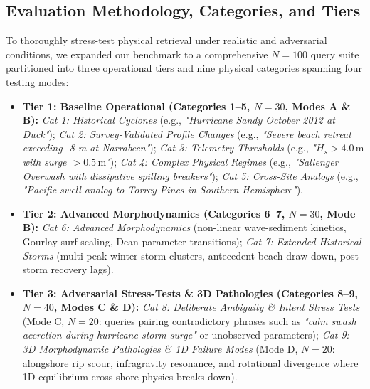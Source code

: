 \documentclass[journal]{IEEEtran}
\begin{document}
\subsection{Evaluation Methodology, Categories, and Tiers}
To thoroughly stress-test physical retrieval under realistic and adversarial conditions, we expanded our benchmark to a comprehensive $N = 100$ query suite partitioned into three operational tiers and nine physical categories spanning four testing modes:
\begin{itemize}
    \item \textbf{Tier 1: Baseline Operational (Categories 1--5, $N = 30$, Modes A \& B):}
    \textit{Cat 1: Historical Cyclones} (e.g., \textit{"Hurricane Sandy October 2012 at Duck"}); \textit{Cat 2: Survey-Validated Profile Changes} (e.g., \textit{"Severe beach retreat exceeding -8 m at Narrabeen"}); \textit{Cat 3: Telemetry Thresholds} (e.g., \textit{"$H_s > 4.0\,\text{m}$ with surge $> 0.5\,\text{m}$"}); \textit{Cat 4: Complex Physical Regimes} (e.g., \textit{"Sallenger Overwash with dissipative spilling breakers"}); \textit{Cat 5: Cross-Site Analogs} (e.g., \textit{"Pacific swell analog to Torrey Pines in Southern Hemisphere"}).
    \item \textbf{Tier 2: Advanced Morphodynamics (Categories 6--7, $N = 30$, Mode B):}
    \textit{Cat 6: Advanced Morphodynamics} (non-linear wave-sediment kinetics, Gourlay surf scaling, Dean parameter transitions); \textit{Cat 7: Extended Historical Storms} (multi-peak winter storm clusters, antecedent beach draw-down, post-storm recovery lags).
    \item \textbf{Tier 3: Adversarial Stress-Tests \& 3D Pathologies (Categories 8--9, $N = 40$, Modes C \& D):}
    \textit{Cat 8: Deliberate Ambiguity \& Intent Stress Tests} (Mode C, $N=20$: queries pairing contradictory phrases such as \textit{"calm swash accretion during hurricane storm surge"} or unobserved parameters); \textit{Cat 9: 3D Morphodynamic Pathologies \& 1D Failure Modes} (Mode D, $N=20$: alongshore rip scour, infragravity resonance, and rotational divergence where 1D equilibrium cross-shore physics breaks down).
\end{itemize}
\end{document}
